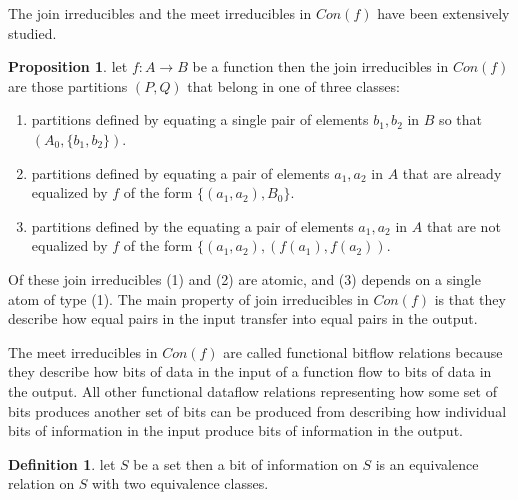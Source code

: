 \documentclass[a4paper,11pt, notitlepage]{report}
\theoremstyle{definition}
\newtheorem{definition}{Definition}[section]
\newtheorem{proposition}{Proposition}[section]
\begin{document}
\begin{figure*}[ht!]
\centering
\begin{subfigure}{.5\textwidth}
  \centering
  \texttt{[image: \{./cong.png]}}
  \caption{Con(f)}
  \label{fig:sub1}
\end{subfigure}%
\begin{subfigure}{.5\textwidth}
  \centering
  \texttt{[image: \{./conf.png]}}
  \caption{Con(f)}
  \label{fig:sub2}
\end{subfigure}
\caption{Congruence lattices of small functions}
\end{figure*}

The join irreducibles and the meet irreducibles in $Con(f)$ have been extensively studied.

\begin{proposition}
let $f: A \to B$ be a function then the join irreducibles in $Con(f)$ are those partitions $(P,Q)$ that belong in one of three classes:
\begin{enumerate}
 \item partitions defined by equating a single pair of elements $b_1,b_2$ in $B$ so that $(A_0,\{b_1,b_2\})$.
 \item partitions defined by equating a pair of elements $a_1,a_2$ in $A$ that are already equalized by $f$ of the form $\{(a_1,a_2),B_0\}$.
 \item partitions defined by the equating a pair of elements $a_1,a_2$ in $A$ that are not equalized by $f$ of the form $\{(a_1,a_2),(f(a_1),f(a_2))$.
\end{enumerate}
\end{proposition}

Of these join irreducibles (1) and (2) are atomic, and (3) depends on a single atom of type (1). The main property of join irreducibles in $Con(f)$ is that they describe how equal pairs in the input transfer into equal pairs in the output.

The meet irreducibles in $Con(f)$ are called functional bitflow relations because they describe how bits of data in the input of a function flow to bits of data in the output. All other functional dataflow relations representing how some set of bits produces another set of bits can be produced from describing how individual bits of information in the input produce bits of information in the output.

\begin{definition}
let $S$ be a set then a bit of information on $S$ is an equivalence relation on $S$ with two equivalence classes.
\end{definition}
\end{document}
